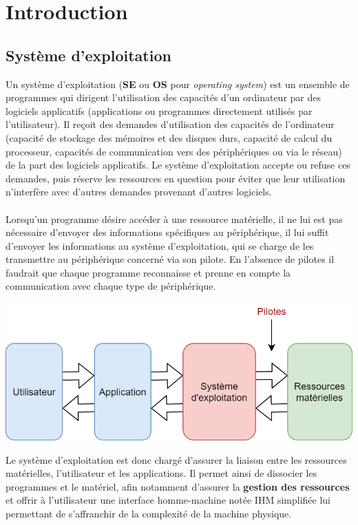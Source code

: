 \section{Introduction}
	
	\subsection{Système d'exploitation}
		Un système d’exploitation (\textbf{SE} ou \textbf{OS} pour \textit{operating system}) est un ensemble de programmes qui dirigent l'utilisation des capacités d’un ordinateur par des logiciels applicatifs (applications ou programmes directement utilisés par l’utilisateur). Il reçoit des demandes d'utilisation des capacités de l'ordinateur (capacité de stockage des mémoires et des disques durs, capacité de calcul du processeur, capacités de communication vers des périphériques ou via le réseau) de la part des logiciels applicatifs. Le système d'exploitation accepte ou refuse ces demandes, puis réserve les ressources en question pour éviter que leur utilisation n'interfère avec d'autres demandes provenant d'autres logiciels.
		
		\paragraph{} Lorsqu'un programme désire accéder à une ressource matérielle, il ne lui est pas nécessaire d'envoyer des informations spécifiques au périphérique, il lui suffit d'envoyer les informations au système d'exploitation, qui se charge de les transmettre au périphérique concerné via son pilote. En l'absence de pilotes il faudrait que chaque programme reconnaisse et prenne en compte la communication avec chaque type de périphérique.
	
		\begin{center}\includegraphics[scale=0.4]{../img/SE.png}\end{center}

		Le système d’exploitation est donc chargé d'assurer la liaison entre les ressources matérielles, l'utilisateur et les applications. Il permet ainsi de dissocier les programmes et le matériel, afin notamment d'assurer la \textbf{gestion des ressources} et offrir à l'utilisateur une interface homme-machine notée IHM simplifiée lui permettant de s'affranchir de la complexité de la machine physique.

